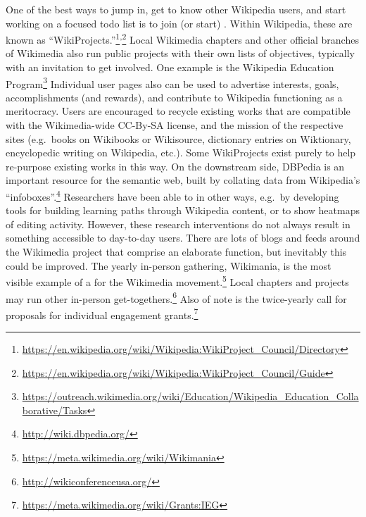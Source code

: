 One of the best ways to jump in, get to know other Wikipedia users,
and start working on a focused todo list is to join (or start)
.  Within Wikipedia, these are known
as
``WikiProjects.''\footnote{\url{https://en.wikipedia.org/wiki/Wikipedia:WikiProject_Council/Directory}}\textsuperscript{,}\footnote{\url{https://en.wikipedia.org/wiki/Wikipedia:WikiProject_Council/Guide}}
Local Wikimedia chapters and other official branches of Wikimedia also
run public projects with their own lists of objectives, typically with
an invitation to get involved.  One example is the Wikipedia Education
Program\footnote{\url{https://outreach.wikimedia.org/wiki/Education/Wikipedia_Education_Collaborative/Tasks}}
Individual user pages also can be used to advertise interests, goals,
accomplishments (and rewards), and contribute to Wikipedia functioning as
a meritocracy.
%
Users are encouraged to recycle existing works that are compatible
with the Wikimedia-wide CC-By-SA license, and the mission of the
respective sites (e.g.~books on Wikibooks or Wikisource, dictionary
entries on Wiktionary, encyclopedic writing on Wikipedia, etc.).  Some
WikiProjects exist purely to help re-purpose existing works in this
way.  On the downstream side, DBPedia is an important resource for the
semantic web, built by collating data from Wikipedia's
``infoboxes''.\footnote{\url{http://wiki.dbpedia.org/}} Researchers
have been able to  in other ways,
e.g.~by developing tools for building learning paths through Wikipedia
content, or to show heatmaps of editing activity.  However, these
research interventions do not always result in something accessible to
day-to-day users.  There are lots of blogs and feeds around the
Wikimedia project that comprise an elaborate 
function, but inevitably this could be improved.
% 
The yearly in-person gathering, Wikimania, is the most visible
example of a  for the Wikimedia movement.\footnote{\url{https://meta.wikimedia.org/wiki/Wikimania}}
Local chapters and projects may run other in-person get-togethers.\footnote{\url{http://wikiconferenceusa.org/}}
Also
of note is the twice-yearly call for proposals for individual
engagement
grants.\footnote{\url{https://meta.wikimedia.org/wiki/Grants:IEG}}

